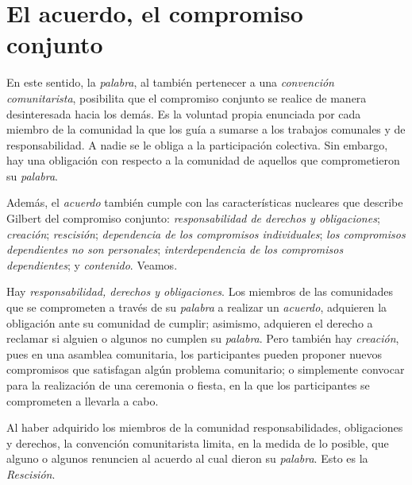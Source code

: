\documentclass[oneside]{book}
\begin{document}
\section{El acuerdo, el compromiso conjunto}

En este sentido, la \textit{palabra}, al también pertenecer a una \textit{convención comunitarista}, posibilita que el compromiso conjunto se realice de manera desinteresada hacia los demás. Es la voluntad propia enunciada por cada miembro de la comunidad la que los guía a sumarse a los trabajos comunales y de responsabilidad. A nadie se le obliga a la participación colectiva. Sin embargo, hay una obligación con respecto a la comunidad de aquellos que comprometieron su \textit{palabra}.

Además, el \textit{acuerdo} también cumple con las características nucleares que describe Gilbert del compromiso conjunto: \textit{responsabilidad de derechos y obligaciones}; \textit{creación}; \textit{rescisión}; \textit{dependencia de los compromisos individuales}; \textit{los compromisos dependientes no son personales}; \textit{interdependencia de los compromisos dependientes}; y \textit{contenido}. Veamos.
	
Hay \textit{responsabilidad, derechos y obligaciones}. Los miembros de las comunidades que se comprometen a través de su \textit{palabra} a realizar un \textit{acuerdo}, adquieren la obligación ante su comunidad de cumplir; asimismo, adquieren el derecho a reclamar si alguien o algunos no cumplen su \textit{palabra}. Pero también hay \textit{creación}, pues en una asamblea comunitaria, los participantes pueden proponer nuevos compromisos que satisfagan algún problema comunitario; o simplemente convocar para la realización de una ceremonia o fiesta, en la que los participantes se comprometen a llevarla a cabo.
	
Al haber adquirido los miembros de la comunidad responsabilidades, obligaciones y derechos, la convención comunitarista limita, en la medida de lo posible, que alguno o algunos renuncien al acuerdo al cual dieron su \textit{palabra}. Esto es la \textit{Rescisión}.
	
\end{document}
